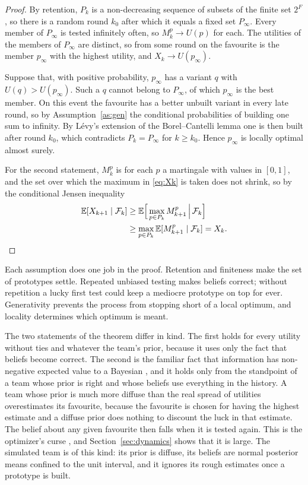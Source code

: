 \documentclass[10pt,twocolumn]{article}
\newcommand{\E}{\mathbb{E}}
\newcommand{\filt}{\mathcal{F}}
\newcommand{\Pk}{P_k}
\theoremstyle{definition}
\begin{document}
\begin{proof}
By retention, $\Pk$ is a non-decreasing sequence of subsets of the finite set $2^F$, so there is a random round $k_0$ after which it equals a fixed set $P_\infty$. Every member of $P_\infty$ is tested infinitely often, so $M^p_k\to U(p)$ for each. The utilities of the members of $P_\infty$ are distinct, so from some round on the favourite is the member $p_\infty$ with the highest utility, and $X_k\to U(p_\infty)$.

Suppose that, with positive probability, $p_\infty$ has a variant $q$ with $U(q)>U(p_\infty)$. Such a $q$ cannot belong to $P_\infty$, of which $p_\infty$ is the best member. On this event the favourite has a better unbuilt variant in every late round, so by Assumption~\ref{as:gen} the conditional probabilities of building one sum to infinity. By L\'evy's extension of the Borel--Cantelli lemma \citep[Sec.~4.3]{durrett2019} one is then built after round $k_0$, which contradicts $\Pk=P_\infty$ for $k\ge k_0$. Hence $p_\infty$ is locally optimal almost surely.

For the second statement, $M^p_k$ is for each $p$ a martingale with values in $[0,1]$, and the set over which the maximum in \eqref{eq:Xk} is taken does not shrink, so by the conditional Jensen inequality
\begin{align*}
\E[X_{k+1}\mid\filt_k]&\ge\E\Big[\max_{p\in \Pk}M^p_{k+1}\,\Big|\,\filt_k\Big]\\
&\ge\max_{p\in \Pk}\E[M^p_{k+1}\mid\filt_k]=X_k .\qedhere
\end{align*}
\end{proof}

Each assumption does one job in the proof. Retention and finiteness make the set of prototypes settle. Repeated unbiased testing makes beliefs correct; without repetition a lucky first test could keep a mediocre prototype on top for ever. Generativity prevents the process from stopping short of a local optimum, and locality determines which optimum is meant.

The two statements of the theorem differ in kind. The first holds for every utility without ties and whatever the team's prior, because it uses only the fact that beliefs become correct. The second is the familiar fact that information has non-negative expected value to a Bayesian \citep{degroot2004}, and it holds only from the standpoint of a team whose prior is right and whose beliefs use everything in the history. A team whose prior is much more diffuse than the real spread of utilities overestimates its favourite, because the favourite is chosen for having the highest estimate and a diffuse prior does nothing to discount the luck in that estimate. The belief about any given favourite then falls when it is tested again. This is the optimizer's curse \citep{smithwinkler2006}, and Section~\ref{sec:dynamics} shows that it is large. The simulated team is of this kind: its prior is diffuse, its beliefs are normal posterior means confined to the unit interval, and it ignores its rough estimates once a prototype is built.
\end{document}
